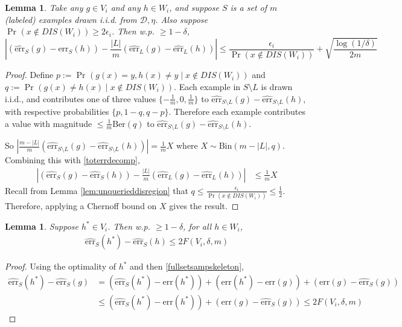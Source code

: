 \documentclass{article}[12pt]
\newtheorem{lem}[thm]{Lemma}
\theoremstyle{named}
\DeclareMathOperator{\Prtxt}{Pr}
\newcommand{\abs}[1]{\left| #1 \right|}
\newcommand{\prp}[2]{\Prtxt_{#2} \left(#1\right)}
\newcommand{\err}[1]{\mbox{err}\left(#1\right)}
\newcommand{\emperr}[2]{\widehat{\mbox{err}}_{#2} \left(#1\right)}
\newcommand{\cD}{\mathcal{D}}
\newcommand{\lrp}[1]{\left(#1\right)}
\begin{document}
\begin{lem}
\label{lem:unqueriederr}
Take any $g \in V_i$ and any $h \in W_i$, 
and suppose $S$ is a set of $m$ (labeled) examples drawn i.i.d. from $\cD, \eta$. 
Also suppose $\prp{x \notin DIS(W_i)}{} \geq 2 \epsilon_i$.
Then w.p. $\geq 1-\delta$, 
$$ \abs{ \lrp{ \emperr{g}{S} - \emperr{h}{S} } - \frac{\abs{L}}{m} \lrp{\emperr{g}{L}  - \emperr{h}{L} } } 
\leq \frac{\epsilon_i}{\prp{x \notin DIS(W_i)}{}} + \sqrt{\frac{\log (1/\delta)}{2m }} $$
\end{lem}
\begin{proof}
Define $p := \prp{g(x) = y , h(x) \neq y \mid x \notin DIS(W_i)}{} $ and 
$q := \prp{g(x) \neq h(x) \mid x \notin DIS(W_i)}{}$.
Each example in $S \setminus L$ is drawn i.i.d., and contributes one of three values $ \{ - \frac{1}{m}, 0, \frac{1}{m} \}$ 
to $\emperr{g}{S \setminus L} - \emperr{h}{S \setminus L}$, 
with respective probabilities $\{ p , 1 - q , q - p \}$. 
Therefore each example contributes a value with magnitude 
$\leq \frac{1}{m} \mbox{Ber} (q)$ to 
$\emperr{g}{S \setminus L} - \emperr{h}{S \setminus L}$.

So $ \abs{ \frac{m - \abs{L}}{m} \lrp{ \emperr{g}{S \setminus L} - \emperr{h}{S \setminus L} } } = 
\frac{1}{m} X$ where $X \sim \mbox{Bin}\lrp{m - \abs{L}, q } $. 
Combining this with \eqref{toterrdecomp},
\begin{align*}
\abs{ \lrp{ \emperr{g}{S} - \emperr{h}{S} } - \frac{\abs{L}}{m} \lrp{\emperr{g}{L}  - \emperr{h}{L} } } &\leq \frac{1}{m} X
\end{align*}
Recall from Lemma \ref{lem:unquerieddisregion} that $q \leq \frac{\epsilon_i}{\prp{x \notin DIS(W_i)}{}} \leq \frac{1}{2}$. 
Therefore, applying a Chernoff bound on $X$ gives the result.
\end{proof}


\begin{lem}
\label{lem:empbestincoverisbest}
Suppose $h^* \in V_i$. Then w.p. $\geq 1-\delta$, for all $h \in W_i$,
\begin{align*}
\emperr{h^*}{S} - \emperr{h}{S} \leq 2 F (V_i, \delta, m)
\end{align*}
\end{lem}
\begin{proof}
Using the optimality of $h^*$ and then \eqref{fullsetsampskeleton}, 
\begin{align*}
\emperr{h^*}{S} - \emperr{g}{S} &= \lrp{ \emperr{h^*}{S} - \err{h^*} } + \lrp{ \err{h^*} - \err{g} } + \lrp{ \err{g} - \emperr{g}{S} } \\
&\leq \lrp{ \emperr{h^*}{S} - \err{h^*} } + \lrp{ \err{g} - \emperr{g}{S} } \leq 2 F (V_i, \delta, m)
\end{align*}
\end{proof}
\end{document}
